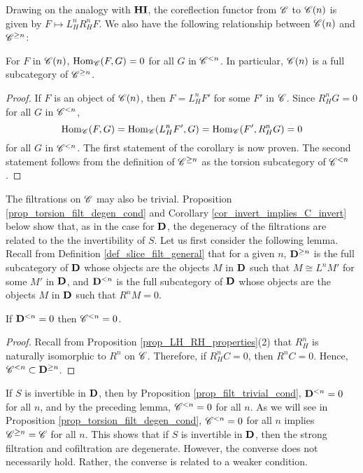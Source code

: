 Drawing on the analogy with $\HI$, the coreflection functor from 
$\Cat{C}$ to $\SGFilt{n}{\Cat{C}}$ is given by $F \mapsto 
L_H^n R_H^n F$. We also have the following relationship between 
$\SGFilt{n}{\Cat{C}}$ and $\Prerad{n}{\Cat{C}}$:

\begin{cor}\label{cor_sg_sub_prerad}
For $F$ in $\SGFilt{n}{\Cat{C}}$, $\hom_{\Cat{C}}(F, G) = 0$ for
all $G$ in $\Corad{n}{\Cat{C}}$. In particular, $\SGFilt{n}{\Cat{C}}$
is a full subcategory of $\Prerad{n}{\Cat{C}}$.
\end{cor}
\begin{proof}
If $F$ is an object of $\SGFilt{n}{\Cat{C}}$, then $F = L_H^n F'$ for
some $F'$ in $\Cat{C}$. Since $R_H^n G = 0$ for all $G$ in 
$\Corad{n}{\Cat{C}}$,
\[
\hom_{\Cat{C}}(F, G) = \hom_{\Cat{C}}(L_H^n F', G) = \hom_{\Cat{C}}(F', R_H^n G) = 0
\]
for all $G$ in $\Corad{n}{\Cat{C}}$. The first statement of the 
corollary is now proven. The second statement follows from the 
definition of $\Prerad{n}{\Cat{C}}$ as the torsion subcategory of 
$\Corad{n}{\Cat{C}}$.
\end{proof}

The filtrations on $\Cat{C}$ may also be trivial. Proposition
\ref{prop_torsion_filt_degen_cond} and Corollary 
\ref{cor_invert_implies_C_invert} below show that, as in the case 
for $\DCat$, the degeneracy of the filtrations are related to the 
the invertibility of $S$. Let us first consider the following 
lemma. Recall from Definition \ref{def_slice_filt_general} that 
for a given $n$, $\Prerad{n}{\DCat}$ is the full subcategory of 
$\DCat$ whose objects are the objects $M$ in $\DCat$ such that $M 
\cong L^nM'$ for some $M'$ in $\DCat$, and $\Corad{n}{\DCat}$ is 
the full subcategory of $\DCat$ whose objects are the objects $M$ 
in $\DCat$ such that $R^nM = 0$.

\begin{lem}\label{lem_trivial_and_trivial}
If $\Corad{n}{\DCat} = 0$ then $\Corad{n}{\Cat{C}} = 0$.
\end{lem}
\begin{proof}
Recall from Proposition \ref{prop_LH_RH_properties}(2) that $R_H^n$
is naturally isomorphic to $R^n$ on $\Cat{C}$. Therefore, if 
$R_H^n C = 0$, then $R^n C = 0$. Hence, $\Corad{n}{\Cat{C}} 
\subset \Prerad{n}{\DCat}$.
\end{proof}

If $S$ is invertible in $\DCat$, then by Proposition 
\ref{prop_filt_trivial_cond}, $\Corad{n}{\DCat} = 0$ for all $n$, 
and by the preceding lemma, $\Corad{n}{\Cat{C}} = 0$ for all $n$. 
As we will see in Proposition \ref{prop_torsion_filt_degen_cond}, 
$\Corad{n}{\Cat{C}} = 0$ for all $n$ implies $\Prerad{n}{\Cat{C}} = 
\Cat{C}$ for all $n$. This shows that if $S$ is invertible in $\DCat$,
then the strong filtration and cofiltration are degenerate. 
However, the converse does not necessarily hold. Rather, the 
converse is related to a weaker condition. 

